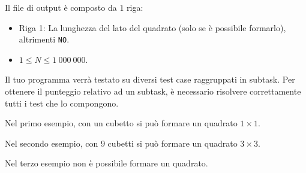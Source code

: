 Il file di output è composto da $1$ riga:
\begin{itemize}
    \item Riga 1: La lunghezza del lato del quadrato (solo se è possibile formarlo), altrimenti \texttt{NO}.
\end{itemize}


\Constraints

\begin{itemize}[nolistsep, itemsep=2mm]
    \item $1 \le N \le 1\:000\:000$.
\end{itemize}


\Scoring

Il tuo programma verrà testato su diversi test case raggruppati in subtask.
Per ottenere il punteggio relativo ad un subtask,
è necessario risolvere correttamente tutti i test che lo compongono.






\Examples

\begin{example}
\end{example}


\Explanation

Nel primo esempio, con un cubetto si può formare un quadrato $1\times1$.

Nel secondo esempio, con $9$ cubetti si può formare un quadrato $3\times3$.

Nel terzo esempio non è possibile formare un quadrato.